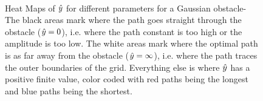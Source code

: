 \begin{figure}[t]
{\label{fig:gvp}}\\
\qquad
{}
\caption{Heat Maps of $\hat{y}$ for different parameters for a Gaussian obstacle- The black areas mark where the path goes straight through the obstacle ($\hat{y}=0$), i.e. where the path constant is too high or the amplitude is too low. The white areas mark where the optimal path is as far away from the obstacle ($\hat{y}=\infty$), i.e. where the path traces the outer boundaries of the grid. Everything else is where $\hat{y}$ has a positive finite value, color coded with red paths being the longest and blue paths being the shortest.}
\label{fig:colormaps}
\end{figure}

